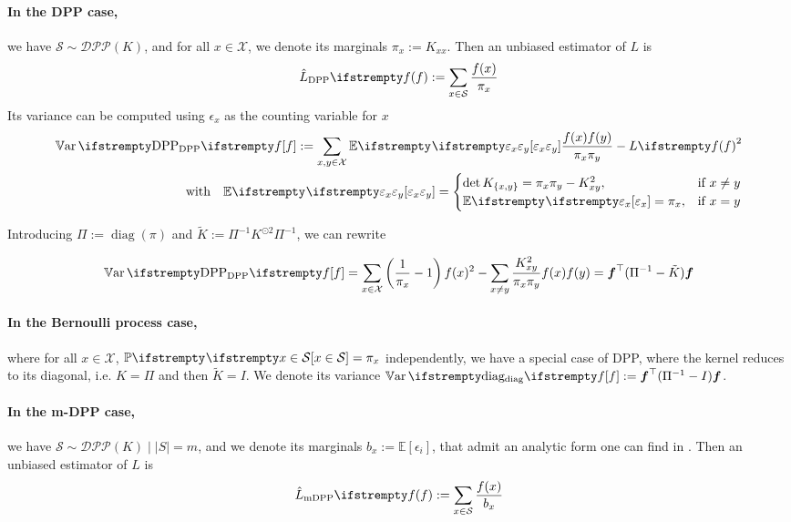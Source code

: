 \paragraph{In the DPP case,} we have $ \mathcal S \sim \mathcal{DPP}(K)$, and for all $x \in \mathcal{X}$, we denote its marginals $\pi_x := K_{xx}$. Then an unbiased estimator of $L$ is
\begin{equation*}
	\estloss{\textrm{DPP}}{\query} := \sum_{x\in \mathcal S} \frac{\query(x)}{\pi_x}
\end{equation*}
Its variance can be computed using $\epsilon_x$ as the counting variable for $x$
\begin{align*}
	\Var{\textrm{DPP}}{\query}
:=\sum_{x,y \in \mathcal{X}}\EE{}{\epsilon_{x} \epsilon_{y}} \frac{\query(x) \query(y)} {\pi_{x} \pi_{y}}  - \loss{\query}^{2}\\
\quad \text{with} \quad
\EE{}{\epsilon_{x} \epsilon_{y}}=
\begin{cases}
	\det K_{\{x, y\}}=\pi_{x} \pi_{y}-K_{xy}^{2}, & \text{if } x \neq y \\
	\EE{}{\epsilon_{x}}=\pi_{x},&\text{if } x = y
\end{cases}
\end{align*}



Introducing $\Pi := \operatorname{diag}(\pi)$ and $\tilde K := \Pi^{-1}K^{\odot 2} \Pi^{-1}$, we can rewrite  

\begin{equation}
	\Var{\textrm{DPP}}{\query}=\sum_{x \in \mathcal{X}}\left(\frac{1}{\pi_{x}}-1\right) \query(x)^{2}-\sum_{x \neq y} \frac{K_{xy}^{2}}{\pi_{x} \pi_{y}} \query(x) \query(y) =  \boldsymbol\query\T (\Pi^{-1}  - \tilde{K}) \boldsymbol\query 
\end{equation}

\paragraph{In the Bernoulli process case,} where for all $x \in \mathcal{X}$, $\PP{}{x \in \mathcal S} = \pi_x$ independently, we have a special case of DPP, where the kernel reduces to its diagonal, i.e. $K = \Pi$ and then $\tilde K = I$. We denote its variance $\Var{\textrm{diag}}{f} := \boldsymbol\query\T (\Pi^{-1}  - I) \boldsymbol\query $.


\paragraph{In the m-DPP case,} we have $\mathcal S \sim \mathcal{DPP}(K) \mid |S|=m$, and we denote its marginals $b_{x} := \mathbb{E}\left[\epsilon_{i}\right]$, that admit an analytic form one can find in \cite{kulesza2012_dpp_for_ml}. Then an unbiased estimator of $L$ is
\begin{equation*}
	\estloss{\textrm{mDPP}}{\query} := \sum_{x\in \mathcal S} \frac{\query(x)}{b_x}
\end{equation*}

